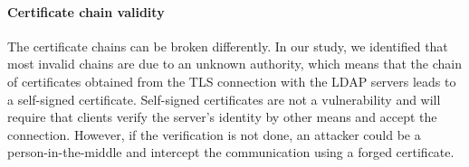 \paragraph{Certificate chain validity} The certificate chains can be broken differently. In our study, we identified that most invalid chains are due to an unknown authority, which means that the chain of certificates obtained from the TLS connection with the LDAP servers leads to a self-signed certificate. Self-signed certificates are not a vulnerability and will require that clients verify the server's identity by other means and accept the connection. However, if the verification is not done, an attacker could be a person-in-the-middle and intercept the communication using a forged certificate.
